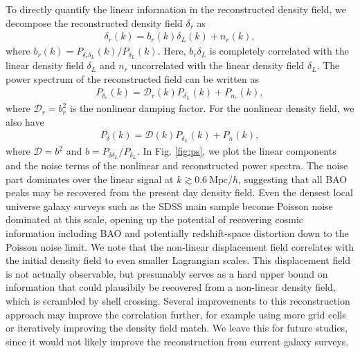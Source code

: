 \documentclass[aps,prl,twocolumn,showpacs,superscriptaddress,groupedaddress,nofootinbib]{revtex4}  %
\newcommand{\mr}{\mathrm}
\newcommand{\mc}{\mathcal}
\newcommand{\bea}{\begin{eqnarray}}
\newcommand{\eea}{\end{eqnarray}}
\begin{document}
To directly quantify the linear information in the reconstructed
density field, we decompose the reconstructed density field $\delta_r$ as
\bea
\delta_r(k)=b_r(k)\delta_L(k)+n_r(k),
\eea
where $b_r(k)=P_{\delta_r\delta_L}(k)/P_{\delta_L}(k)$. 
Here, $b_r\delta_L$ is completely correlated with the linear density field 
$\delta_L$ and $n_r$ uncorrelated with the linear density field $\delta_L$.
The power spectrum of the reconstructed field can be written as
\bea
P_{\delta_r}(k)=\mc{D}_r(k)P_{\delta_L}(k)+P_{n_r}(k),
\eea
where $\mc{D}_r=b_r^2$ is the nonlinear damping factor. 
For the nonlinear density field, we also have
\bea
P_{\delta}(k)=\mc{D}(k)P_{\delta_L}(k)+P_{n}(k),
\eea
where $\mc{D}=b^2$ and $b=P_{\delta\delta_L}/P_{\delta_L}$. 
In Fig. \ref{fig:ps}, we plot the linear components and the noise terms of the
nonlinear and reconstructed power spectra. The noise part dominates over the linear 
signal at $k\gtrsim0.6\ \mr{Mpc}/h$, suggesting that all BAO peaks may
be recovered from the present day density field.  Even the densest local
universe galaxy surveys such as the SDSS main sample become Poisson
noise dominated at this scale, opening up the potential of recovering
cosmic information including BAO and potentially redshift-space
distortion down to the Poisson noise limit.  We note that the
non-linear displacement field correlates with the initial density
field to even smaller Lagrangian scales.  This displacement field is
not actually observable, but presumably serves as a hard upper bound
on information that could plausibily be recovered from a non-linear
density field, which is scrambled by shell crossing.  Several
improvements to this reconstruction approach may improve the
correlation further, for example using more grid cells or iteratively
improving the density field match.  We leave this for future studies,
since it would not likely improve the reconstruction from current
galaxy surveys. 
\end{document}
